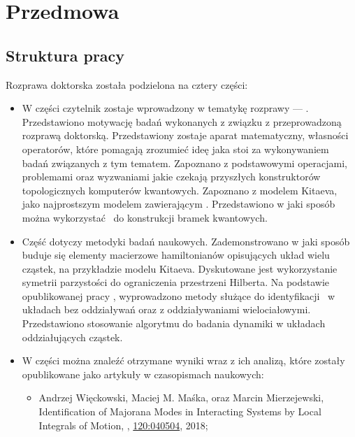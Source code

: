 \chapter*{Przedmowa}



\section*{Struktura pracy}


Rozprawa doktorska została podzielona na cztery części:
\begin{itemize}
    \item W części \hyperref[part:I]{} czytelnik zostaje wprowadzony w tematykę rozprawy --- .
    Przedstawiono motywację badań wykonanych z związku z przeprowadzoną rozprawą doktorską.
    Przedstawiony zostaje aparat matematyczny, własności operatorów, które pomagają zrozumieć ideę jaka stoi za wykonywaniem badań związanych z tym tematem.
    Zapoznano z podstawowymi operacjami, problemami oraz wyzwaniami jakie czekają przyszłych konstruktorów topologicznych komputerów kwantowych.
    Zapoznano z modelem Kitaeva, jako najprostszym modelem zawierającym \MZM.
    Przedstawiono w jaki sposób można wykorzystać \MZM\ do konstrukcji bramek kwantowych.
    
    \item Część \hyperref[part:II]{} dotyczy metodyki badań naukowych.
    Zademonstrowano w jaki sposób buduje się elementy macierzowe hamiltonianów opisujących układ wielu cząstek, na przykładzie modelu Kitaeva.
    Dyskutowane jest wykorzystanie symetrii parzystości do ograniczenia przestrzeni Hilberta.
    Na podstawie opublikowanej pracy \cite{wieckowski.maska.2018}, wyprowadzono metody służące do identyfikacji \MZM\ w układach bez oddziaływań oraz z oddziaływaniami wielociałowymi.
    Przedstawiono stosowanie algorytmu do badania dynamiki w układach oddziałujących cząstek.
    
    \item W części \hyperref[part:III]{} można znaleźć otrzymane wyniki wraz z ich analizą, które zostały opublikowane jako artykuły w czasopismach naukowych: 
    
    \begin{itemize}
        \item[\cite{wieckowski.maska.2018}] Andrzej Więckowski, Maciej M. Maśka, oraz Marcin Mierzejewski,  Identification  of Majorana Modes in Interacting Systems by Local Integrals of Motion, \href{http://dx.doi.org/10.1103/PhysRevLett.120.040504}{}, \href{http://dx.doi.org/10.1103/PhysRevLett.120.040504}{120:040504}, 2018;
        

\end{itemize}
\end{itemize}
